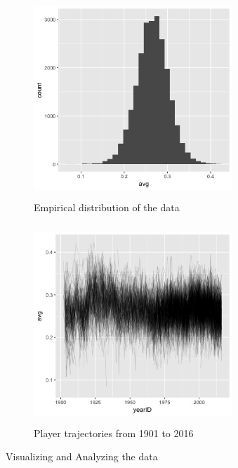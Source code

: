 \documentclass[10pt,a4paper]{article}
\begin{document}
\begin{figure}[H]
 
\begin{subfigure}{0.5\textwidth}
\includegraphics[width=7.5cm,height=7.5cm]{../DataVisHistogram.jpeg} 
\caption{Empirical distribution of the data}
\label{fig:subim1}
\end{subfigure}
\begin{subfigure}{0.5\textwidth}
\includegraphics[width=7.5cm,height=7.5cm]{../PastTrajectories.jpeg}
\caption{Player trajectories from 1901 to 2016}
\label{fig:subim2}
\end{subfigure}

\caption{Visualizing and Analyzing the data}
\label{fig:image2}
\end{figure} 
\end{document}
